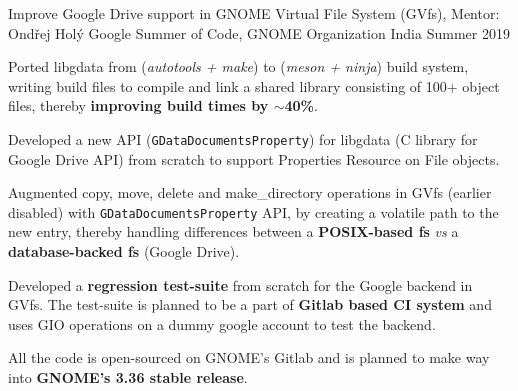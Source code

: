 \begin{cventries}

  \cventry
  {Improve Google Drive support in GNOME Virtual File System (GVfs), Mentor: Ondřej Holý}
  {Google Summer of Code, GNOME Organization}
  {India}
  {Summer 2019}
  {
    \begin{cvitems}
    \item Ported libgdata from (\textit{autotools + make}) to (\textit{meson + ninja}) build system, writing build files to compile and link a shared library consisting of  100+ object files, thereby \textbf{improving build times by $\sim$40\%}.
    \item Developed a new API (\texttt{GDataDocumentsProperty}) for libgdata (C library for Google Drive API) from scratch to support Properties Resource on File objects.
    \item Augmented copy, move, delete and make\_directory operations in GVfs (earlier disabled) with \texttt{GDataDocumentsProperty} API, by creating a volatile path to the new entry, thereby handling differences between a \textbf{POSIX-based fs} \textit{vs} a \textbf{database-backed fs} (Google Drive).
    \item Developed a \textbf{regression test-suite} from scratch for the Google backend in GVfs. The test-suite is planned to be a part of \textbf{Gitlab based CI system} and uses GIO operations on a dummy google account to test the backend.
    \item All the code is open-sourced on GNOME's Gitlab and is planned to make way into \textbf{GNOME's 3.36 stable release}.
    \end{cvitems}
  }


\end{cventries}
